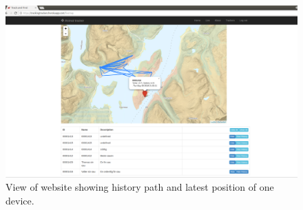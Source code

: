 \begin{appendices}
\begin{figure}[h]
	\caption{View of website showing history path and latest position of one device.}
	\includegraphics[scale=0.25]{website.pdf}
\end{figure}

\end{appendices}






